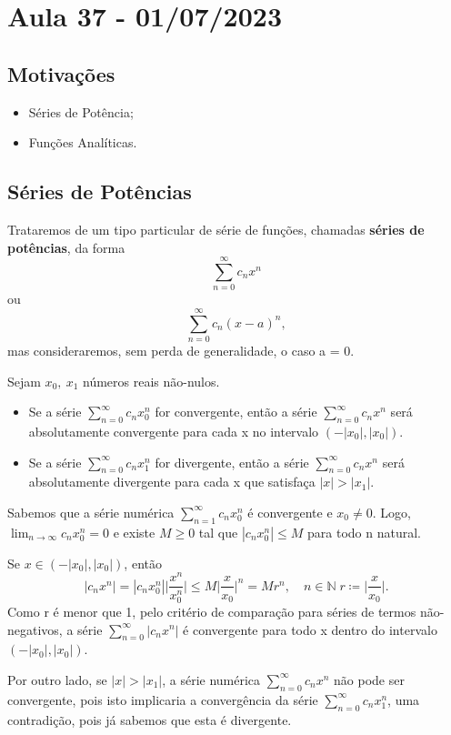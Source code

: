 \documentclass[../analysis_notes.tex]{subfiles}
\begin{document}
\section{Aula 37 - 01/07/2023}
\subsection{Motivações}
\begin{itemize}
	\item Séries de Potência;
	\item Funções Analíticas.
\end{itemize}
\subsection{Séries de Potências}
Trataremos de um tipo particular de série de funções, chamadas \textbf{séries de potências}, da forma
\[
	\sum\limits_{n=0}^{\infty}c_{n}x^{n}
\]
ou
\[
	\sum\limits_{n=0}^{\infty}c_{n}(x-a)^{n},
\]
mas consideraremos, sem perda de generalidade, o caso a = 0.
\begin{prop*}
	Sejam \(x_{0},\: x_{1}\) números reais não-nulos.
	\begin{itemize}
		\item Se a série \(\sum\limits_{n=0}^{\infty}c_{n}x_{0}^{n}\) for convergente, então a série \(\sum\limits_{n=0}^{\infty}c_{n}x^{n}\) será absolutamente convergente para cada x no intervalo \((-|x_{0}|, |x_{0}|)\).
		\item Se a série \(\sum\limits_{n=0}^{\infty}c_{n}x_{1}^{n}\) for divergente, então a série \(\sum\limits_{n=0}^{\infty}c_{n}x^{n}\) será absolutamente divergente para cada x que satisfaça \(|x| > |x_{1}|\).
	\end{itemize}
\end{prop*}
\begin{proof*}
	Sabemos que a série numérica \(\sum\limits_{n=1}^{\infty}c_{n}x_{0}^{n}\) é convergente e \(x_{0}\neq 0\). Logo, \(\lim_{n\to \infty}c_{n}x_{0}^{n} = 0\) e existe \(M\geq 0\) tal que \(|c_{n}x_{0}^{n}|\leq M\) para
	todo n natural.

	Se \(x\in(-|x_{0}|, |x_{0}|)\), então
	\[
		|c_{n}x^{n}| = |c_{n}x_{0}^{n}|\biggl\vert \frac{x^{n}}{x_{0}^{n}} \biggr\vert \leq M \biggl\vert \frac{x}{x_{0}} \biggr\vert^{n} = M r^{n},\quad n\in \mathbb{N}\; r\coloneqq \biggl\vert \frac{x}{x_{0}} \biggr\vert.
	\]
	Como r é menor que 1, pelo critério de comparação para séries de termos não-negativos, a série \(\sum\limits_{n=0}^{\infty}|c_{n}x^{n}|\) é convergente para todo x dentro do intervalo \((-|x_{0}|, |x_{0}|)\).

	Por outro lado, se \(|x| > |x_{1}|\), a série numérica \(\sum\limits_{n=0}^{\infty}c_{n}x^{n}\) não pode ser convergente, pois isto implicaria a convergência da série \(\sum\limits_{n=0}^{\infty}c_{n}x_{1}^{n}\), uma contradição, pois já sabemos que esta é divergente. \qedsymbol
\end{proof*}
\end{document}
